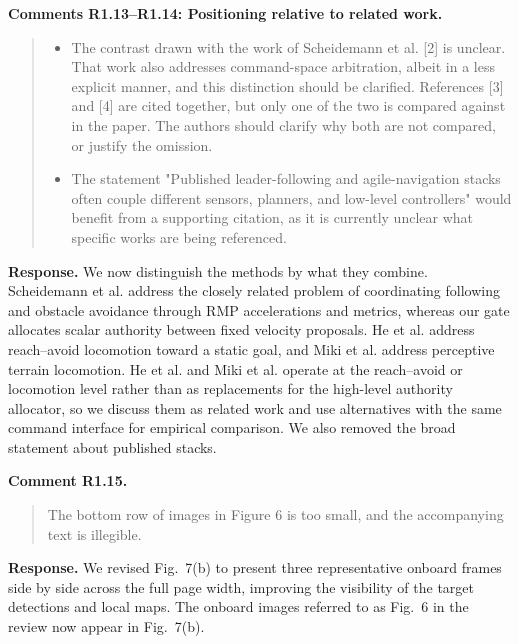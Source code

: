 \documentclass[letterpaper,11pt]{article}
\begin{document}
\noindent\textbf{Comments R1.13--R1.14: Positioning relative to related work.}
\begin{quote}\color{reviewgray}
\begin{itemize}[leftmargin=*,nosep,label={}]
\item[\textbf{R1.13.}] The contrast drawn with the work of Scheidemann et al. [2] is unclear. That work also addresses command-space arbitration, albeit in a less explicit manner, and this distinction should be clarified. References [3] and [4] are cited together, but only one of the two is compared against in the paper. The authors should clarify why both are not compared, or justify the omission.
\item[\textbf{R1.14.}] The statement "Published leader-following and agile-navigation stacks often couple different sensors, planners, and low-level controllers" would benefit from a supporting citation, as it is currently unclear what specific works are being referenced.
\end{itemize}
\end{quote}
\noindent\textbf{Response.}
We now distinguish the methods by what they combine. Scheidemann et al. address the closely related problem of coordinating following and obstacle avoidance through RMP accelerations and metrics, whereas our gate allocates scalar authority between fixed velocity proposals. He et al. address reach--avoid locomotion toward a static goal, and Miki et al. address perceptive terrain locomotion. He et al. and Miki et al. operate at the reach--avoid or locomotion level rather than as replacements for the high-level authority allocator, so we discuss them as related work and use alternatives with the same command interface for empirical comparison. We also removed the broad statement about published stacks.
\par\nopagebreak[4]


\noindent\textbf{Comment R1.15.}
\begin{quote}\color{reviewgray}
The bottom row of images in Figure 6 is too small, and the accompanying text is illegible.
\end{quote}
\noindent\textbf{Response.}
We revised Fig.~7(b) to present three representative onboard frames side by side across the full page width, improving the visibility of the target detections and local maps. The onboard images referred to as Fig.~6 in the review now appear in Fig.~7(b).
\par\nopagebreak[4]
\end{document}
